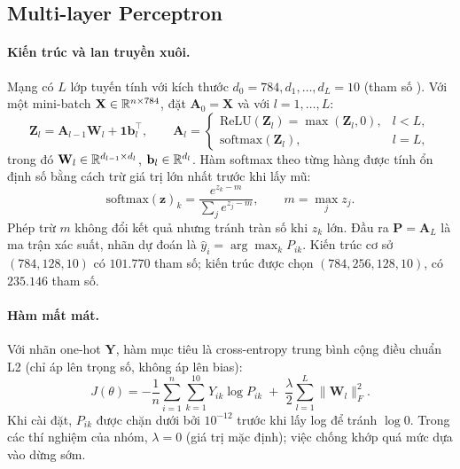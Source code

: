\subsection{Multi-layer Perceptron}
\label{sec:mlp}

\paragraph{Kiến trúc và lan truyền xuôi.}
Mạng có $L$ lớp tuyến tính với kích thước $d_0=784, d_1,\dots,d_L=10$ (tham số ). Với một mini-batch $\mathbf{X}\in\mathbb{R}^{n\times 784}$, đặt $\mathbf{A}_0=\mathbf{X}$ và với $l=1,\dots,L$:
\begin{equation}
  \mathbf{Z}_l = \mathbf{A}_{l-1}\mathbf{W}_l + \mathbf{1}\mathbf{b}_l^{\top},\qquad
  \mathbf{A}_l =
  \begin{cases}
    \mathrm{ReLU}(\mathbf{Z}_l)=\max(\mathbf{Z}_l,0), & l<L,\\[2pt]
    \mathrm{softmax}(\mathbf{Z}_l), & l=L,
  \end{cases}
  \label{eq:forward}
\end{equation}
trong đó $\mathbf{W}_l\in\mathbb{R}^{d_{l-1}\times d_l}$, $\mathbf{b}_l\in\mathbb{R}^{d_l}$. Hàm softmax theo từng hàng được tính ổn định số bằng cách trừ giá trị lớn nhất trước khi lấy mũ:
\begin{equation}
  \mathrm{softmax}(\mathbf{z})_k=\frac{e^{z_k-m}}{\sum_{j}e^{z_j-m}},\qquad m=\max_j z_j .
\end{equation}
Phép trừ $m$ không đổi kết quả nhưng tránh tràn số khi $z_k$ lớn. Đầu ra $\mathbf{P}=\mathbf{A}_L$ là ma trận xác suất, nhãn dự đoán là $\hat{y}_i=\arg\max_k P_{ik}$. Kiến trúc cơ sở $(784,128,10)$ có $101.770$ tham số; kiến trúc được chọn $(784,256,128,10)$, có $235.146$ tham số.

\paragraph{Hàm mất mát.}
Với nhãn one-hot $\mathbf{Y}$, hàm mục tiêu là cross-entropy trung bình cộng điều chuẩn L2 (chỉ áp lên trọng số, không áp lên bias):
\begin{equation}
  J(\theta) = -\frac{1}{n}\sum_{i=1}^{n}\sum_{k=1}^{10} Y_{ik}\log P_{ik}
  \;+\; \frac{\lambda}{2}\sum_{l=1}^{L}\lVert\mathbf{W}_l\rVert_F^2 .
  \label{eq:loss}
\end{equation}
Khi cài đặt, $P_{ik}$ được chặn dưới bởi $10^{-12}$ trước khi lấy log để tránh $\log 0$. Trong các thí nghiệm của nhóm, $\lambda=0$ (giá trị mặc định); việc chống khớp quá mức dựa vào dừng sớm.

